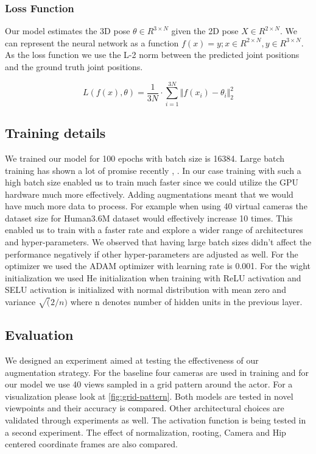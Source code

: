 \subsubsection{Loss Function}

Our model estimates the 3D pose $\theta \in R^{3\times N}$ given the 2D pose $X \in R^{2\times N}$. We can represent the neural network as a function $f(x) = y ; x \in R^{2\times N}, y \in R^{3\times N} $. As the loss function we use the L-2 norm between the predicted joint positions and the ground truth joint positions.

\begin{equation}	
    L(f(x),\theta) = \frac{1}{3N} \cdot \sum_{i=1}^{3N} {\Vert f(x_i)-\theta_i \Vert}_2^2
\end{equation}


\subsection{Training details}

We trained our model for 100 epochs with batch size is 16384. Large batch training has shown a lot of promise recently \parencite{you2017imagenet}, \parencite{goyal2017accurate}. In our case training with such a high batch size enabled us to train much faster since we could utilize the GPU hardware much more effectively. Adding augmentations meant that we would have much more data to process. For example when using 40 virtual cameras the dataset size for Human3.6M dataset would effectively increase 10 times. This enabled us to train with a faster rate and explore a wider range of architectures and hyper-parameters. We observed that having large batch sizes didn't affect the performance negatively if other hyper-parameters are adjusted as well. For the optimizer we used the ADAM optimizer with learning rate is 0.001. For the wight initialization we used He initialization when training with ReLU activation and SELU activation is initialized with normal distribution with mean zero and variance $\sqrt(2 / n)$ where n denotes number of hidden units in the previous layer. 

\subsection{Evaluation}

We designed an experiment aimed at testing the effectiveness of our augmentation strategy. For the baseline four cameras are used in training and for our model we use 40 views sampled in a grid pattern around the actor. For a visualization please look at \autoref{fig:grid-pattern}. Both models are tested in novel viewpoints and their accuracy is compared. 
Other architectural choices are validated through experiments as well. The activation function is being tested in a second experiment. The effect of normalization, rooting, Camera and Hip centered coordinate frames are also compared. 

